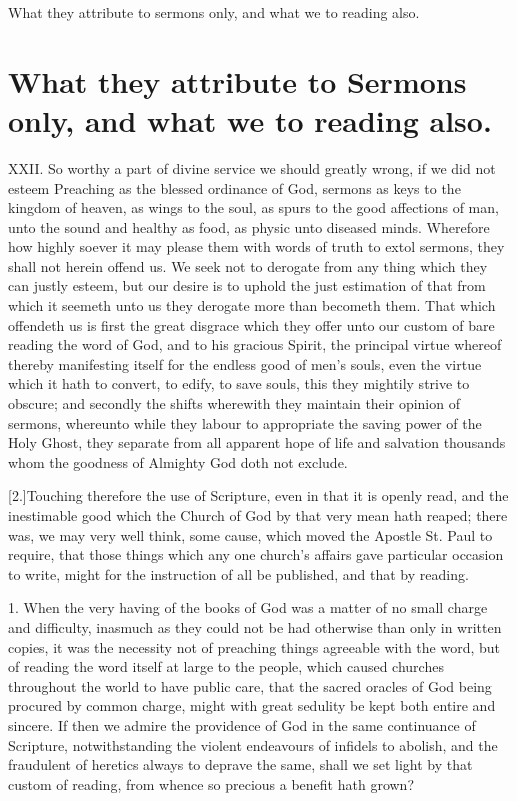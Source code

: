 What they attribute to sermons only, and what we to reading also.
\section*{What they attribute to Sermons only, and what we to reading also.}
XXII. So worthy a part of divine service we should greatly wrong, if we did not esteem Preaching as the blessed ordinance of God, sermons as keys to the kingdom of heaven, as wings to the soul, as spurs to the good affections of man, unto the sound and healthy as food, as physic unto diseased minds. Wherefore how highly soever it may please them with words of truth to extol sermons, they shall not herein offend us. We seek not to derogate from any thing which they can justly esteem, but our desire is to uphold the just estimation of that from which it seemeth unto us they derogate more than becometh them. That which offendeth us is first the great disgrace which they offer unto our custom of bare reading the word of God, and to his gracious Spirit, the principal virtue whereof thereby manifesting itself for the endless good of men’s souls, even the virtue which it hath to convert, to edify, to save souls, this they mightily strive to obscure; and secondly the shifts wherewith they maintain their opinion of sermons, whereunto while they labour to appropriate the saving power of the Holy Ghost, they separate from all apparent hope of life and salvation thousands whom the goodness of Almighty God doth not exclude.

[2.]Touching therefore the use of Scripture, even in that it is openly read, and the inestimable good which the Church of God by that very mean hath reaped; there was, we may very well think, some cause, which moved the Apostle St. Paul to require, that those things which any one church’s  affairs gave particular occasion to write, might for the instruction of all be published, and that by reading.

1. When the very having of the books of God was a matter of no small charge and difficulty, inasmuch as they could not be had otherwise than only in written copies, it was the necessity not of preaching things agreeable with the word, but of reading the word itself at large to the people, which caused churches throughout the world to have public care, that the sacred oracles of God being procured by common charge, might with great sedulity be kept both entire and sincere. If then we admire the providence of God in the same continuance of Scripture, notwithstanding the violent endeavours of infidels to abolish, and the fraudulent of heretics always to deprave the same, shall we set light by that custom of reading, from whence so precious a benefit hath grown?

